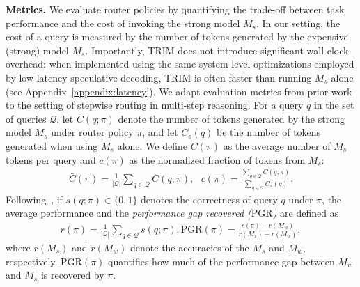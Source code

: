 \documentclass{article}
\theoremstyle{plain}
\theoremstyle{definition}
\theoremstyle{remark}
\begin{document}
\textbf{Metrics.}
We evaluate router policies by quantifying the trade-off between task performance and the cost of invoking the strong model $M_s$. In our setting, the cost of a query is measured by the number of tokens generated by the expensive (strong) model $M_s.$  Importantly, TRIM does not introduce significant wall-clock overhead: when implemented using the same system-level optimizations employed by low-latency speculative decoding, TRIM is often faster than running $M_s$ alone (see Appendix~\ref{appendix:latency}). We adapt evaluation metrics from prior work to the setting of stepwise routing in multi-step reasoning. For a query $q$ in the set of queries $\mathcal{Q}$, let $C(q;\pi)$ denote the number of tokens generated by the strong model $M_s$ under router policy $\pi$, and let $C_s(q)$ be the number of tokens generated when using $M_s$ alone. We define $\bar{C}(\pi)$ as the average number of $M_s$ tokens per query and $c(\pi)$ as the normalized fraction of tokens from $M_s$:
\begin{align}
\bar{C}(\pi) = \frac{1}{|\mathcal{Q}|} \sum_{q \in \mathcal{Q}} C(q;\pi),~~~
c(\pi) = \frac{\sum_{q \in \mathcal{Q}} C(q;\pi)}{\sum_{q \in \mathcal{Q}} C_s(q)}.
\end{align}
Following~\citet{routellm}, if $s(q;\pi) \in \{0,1\}$ denotes the correctness of query $q$ under $\pi$, the average performance and the \emph{performance gap recovered ($\mathrm{PGR}$)} are defined as
\begin{align}
\!\!\!\!r(\pi) = \frac{1}{|\mathcal{Q}|} \sum_{q \in \mathcal{Q}} s(q;\pi),  
\mathrm{PGR}(\pi)\!=\!\frac{ r(\pi)\!-\!r(M_w)}{r(M_s)\!-\!r(M_w)},
\end{align}
where $r(M_s)$ and $r(M_w)$ denote the accuracies of the $M_s$ and $M_w$, respectively. $\mathrm{PGR}(\pi)$ quantifies how much of the performance gap between $M_w$ and $M_s$ is recovered by $\pi$. 
\end{document}

